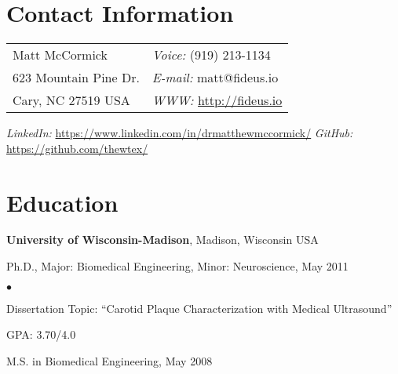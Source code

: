 \documentclass[margin,line]{res}
\newenvironment{list1}{
  \begin{list}{\ding{113}}{%
      \setlength{\itemsep}{0in}
      \setlength{\parsep}{0in} \setlength{\parskip}{0in}
      \setlength{\topsep}{0in} \setlength{\partopsep}{0in}
      \setlength{\leftmargin}{0.17in}}}{\end{list}}
\newenvironment{list2}{
  \begin{list}{$\bullet$}{%
      \setlength{\itemsep}{0in}
      \setlength{\parsep}{0in} \setlength{\parskip}{0in}
      \setlength{\topsep}{0in} \setlength{\partopsep}{0in}
      \setlength{\leftmargin}{0.2in}}}{\end{list}}
\begin{document}

\begin{resume}
\section{\sc Contact Information}
\vspace{.05in}
\begin{tabular}{@{}p{3in}p{4in}}
Matt McCormick                                          & {\it Voice:}  (919) 213-1134 \\
623 Mountain Pine Dr. & {\it E-mail:}  matt@fideus.io \\
Cary, NC 27519 USA & {\it WWW:} \url{http://fideus.io} \\
\end{tabular}

{\it LinkedIn:} \url{https://www.linkedin.com/in/drmatthewmccormick/} \newline
{\it GitHub:} \url{https://github.com/thewtex/} \newline



\section{\sc Education}
{\bf University of Wisconsin-Madison}, Madison, Wisconsin USA \\
\vspace*{-.1in}
\begin{list1}
\item[] Ph.D., Major: Biomedical Engineering, Minor: Neuroscience, May 2011
\begin{list2}
\vspace*{.05in}
\item Dissertation Topic:  ``Carotid Plaque Characterization with Medical
Ultrasound''
\item GPA: 3.70/4.0
\end{list2}
\vspace*{.05in}
\item[] M.S. in Biomedical Engineering, May 2008
\end{list1}


\end{resume}
\end{document}
